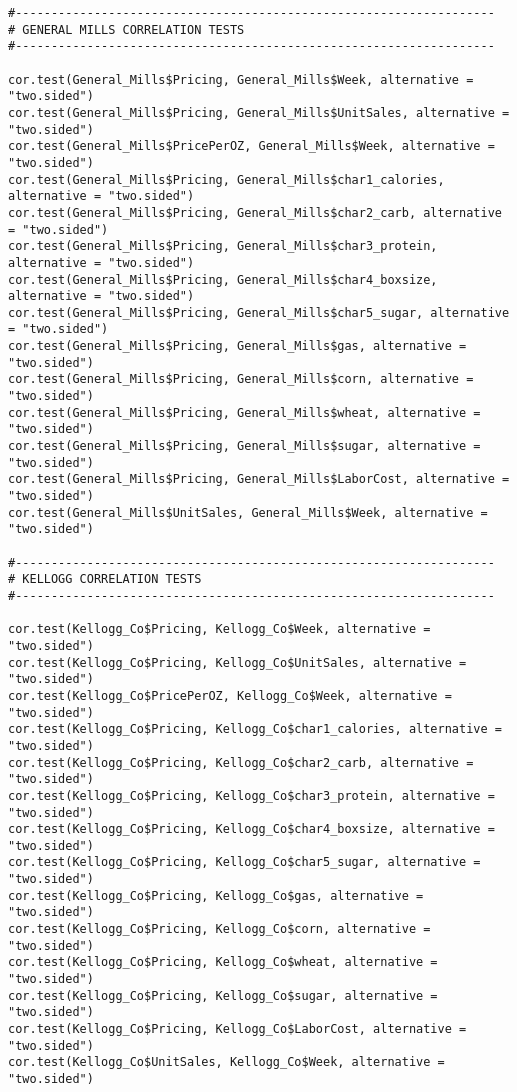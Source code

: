 \documentclass[12pt,english]{article}
\begin{document}
\begin{lstlisting}
#-------------------------------------------------------------------
# GENERAL MILLS CORRELATION TESTS
#-------------------------------------------------------------------

cor.test(General_Mills$Pricing, General_Mills$Week, alternative = "two.sided")
cor.test(General_Mills$Pricing, General_Mills$UnitSales, alternative = "two.sided")
cor.test(General_Mills$PricePerOZ, General_Mills$Week, alternative = "two.sided")
cor.test(General_Mills$Pricing, General_Mills$char1_calories, alternative = "two.sided")
cor.test(General_Mills$Pricing, General_Mills$char2_carb, alternative = "two.sided")
cor.test(General_Mills$Pricing, General_Mills$char3_protein, alternative = "two.sided")
cor.test(General_Mills$Pricing, General_Mills$char4_boxsize, alternative = "two.sided")
cor.test(General_Mills$Pricing, General_Mills$char5_sugar, alternative = "two.sided")
cor.test(General_Mills$Pricing, General_Mills$gas, alternative = "two.sided")
cor.test(General_Mills$Pricing, General_Mills$corn, alternative = "two.sided")
cor.test(General_Mills$Pricing, General_Mills$wheat, alternative = "two.sided")
cor.test(General_Mills$Pricing, General_Mills$sugar, alternative = "two.sided")
cor.test(General_Mills$Pricing, General_Mills$LaborCost, alternative = "two.sided")
cor.test(General_Mills$UnitSales, General_Mills$Week, alternative = "two.sided")

#-------------------------------------------------------------------
# KELLOGG CORRELATION TESTS
#-------------------------------------------------------------------

cor.test(Kellogg_Co$Pricing, Kellogg_Co$Week, alternative = "two.sided")
cor.test(Kellogg_Co$Pricing, Kellogg_Co$UnitSales, alternative = "two.sided")
cor.test(Kellogg_Co$PricePerOZ, Kellogg_Co$Week, alternative = "two.sided")
cor.test(Kellogg_Co$Pricing, Kellogg_Co$char1_calories, alternative = "two.sided")
cor.test(Kellogg_Co$Pricing, Kellogg_Co$char2_carb, alternative = "two.sided")
cor.test(Kellogg_Co$Pricing, Kellogg_Co$char3_protein, alternative = "two.sided")
cor.test(Kellogg_Co$Pricing, Kellogg_Co$char4_boxsize, alternative = "two.sided")
cor.test(Kellogg_Co$Pricing, Kellogg_Co$char5_sugar, alternative = "two.sided")
cor.test(Kellogg_Co$Pricing, Kellogg_Co$gas, alternative = "two.sided")
cor.test(Kellogg_Co$Pricing, Kellogg_Co$corn, alternative = "two.sided")
cor.test(Kellogg_Co$Pricing, Kellogg_Co$wheat, alternative = "two.sided")
cor.test(Kellogg_Co$Pricing, Kellogg_Co$sugar, alternative = "two.sided")
cor.test(Kellogg_Co$Pricing, Kellogg_Co$LaborCost, alternative = "two.sided")
cor.test(Kellogg_Co$UnitSales, Kellogg_Co$Week, alternative = "two.sided")


\end{lstlisting}
\end{document}
